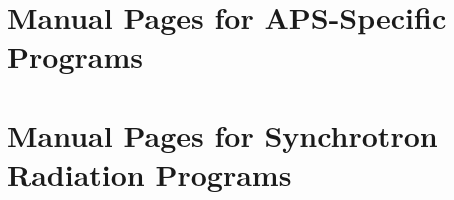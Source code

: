\documentclass[11pt]{article}
\begin{document}
\newpage
\section{Manual Pages for APS-Specific Programs}
\label{APSManualPages}






\newpage
\section{Manual Pages for Synchrotron Radiation Programs}
\label{SyncManualPages}



\tableofcontents
\end{document}
